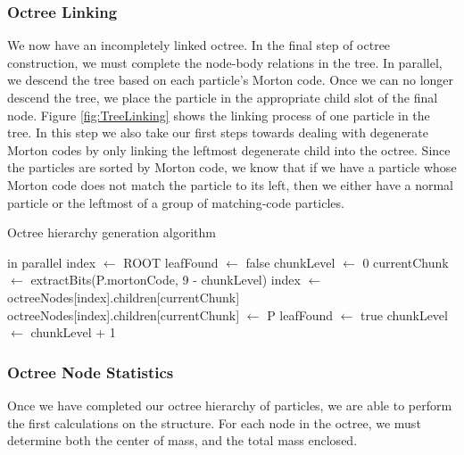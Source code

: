 \documentclass{thesis}
\begin{document}
\subsubsection{Octree Linking}
We now have an incompletely linked octree. In the final step of octree construction, we must complete the node-body relations in the tree. In parallel, we descend the tree based on each particle's Morton code. Once we can no longer descend the tree, we place the particle in the appropriate child slot of the final node. Figure \ref{fig:TreeLinking} shows the linking process of one particle in the tree. In this step we also take our first steps towards dealing with degenerate  Morton codes by only linking the leftmost degenerate child into the octree. Since the particles are sorted by  Morton code, we know that if we have a particle whose  Morton code does not match the particle to its left, then we either have a normal particle or the leftmost of a group of matching-code particles.

\begin{algorithm}
    \label{alg:LinkOctree}
    \caption{Octree hierarchy generation algorithm}
    \begin{algorithmic}
         in parallel
                \State index $\gets$ ROOT
                \State leafFound $\gets$ false
                \State chunkLevel $\gets$ 0
                    \State currentChunk $\gets$ extractBits(P.mortonCode, 9 - chunkLevel)
                        \State index $\gets$ octreeNodes[index].children[currentChunk]
                    \Else
                        \State octreeNodes[index].children[currentChunk] $\gets$ P
                        \State leafFound $\gets$ true
                    \EndIf
                    \State chunkLevel $\gets$ chunkLevel + 1
                \EndWhile
            \EndIf
        \EndFor
    \end{algorithmic}
\end{algorithm}
\subsubsection{Octree Node Statistics} %
Once we have completed our octree hierarchy of particles, we are able to perform the first calculations on the structure. For each node in the octree, we must determine both the center of mass, and the total mass enclosed.
\end{document}
